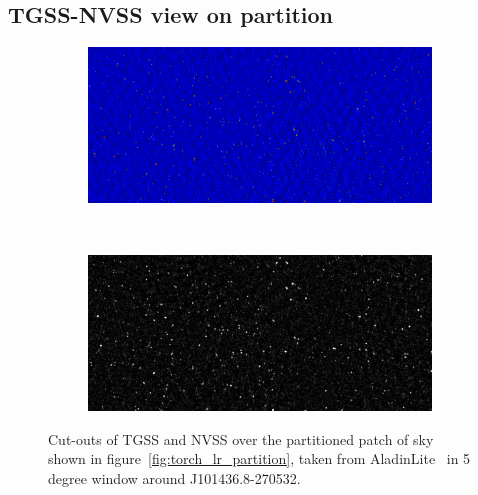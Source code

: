 \documentclass[12pt,a4paper]{article}
\begin{document}
\subsection{TGSS-NVSS view on partition}
\label{app:windows}

\begin{figure}[H]
    \begin{subfigure}{1\textwidth}
        \centering
        \includegraphics[width=1\linewidth]{pics/tgss_window.pdf}
    \end{subfigure}
    \\
    \begin{subfigure}{1\textwidth}
      \centering
        \includegraphics[width=1\linewidth]{pics/nvss_window.pdf}
    \end{subfigure}
    \caption{Cut-outs of TGSS and NVSS over the partitioned patch of sky shown in
    figure~\ref{fig:torch_lr_partition}, taken from AladinLite~\citep{aladinlite} in 5 degree window around  J101436.8-270532.}
    \label{fig:tgss-nvss-windows}
\end{figure}
\end{document}
